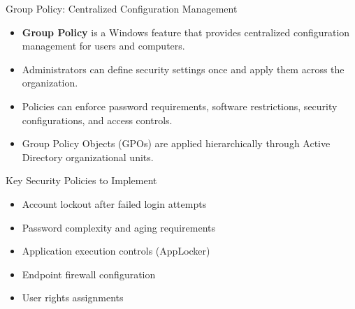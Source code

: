 \documentclass{beamer}
\begin{document}
            \begin{frame}{Group Policy: Centralized Configuration Management}
            \begin{itemize}
                \item \textbf{Group Policy} is a Windows feature that provides centralized configuration management for users and computers.
                \item Administrators can define security settings once and apply them across the organization.
                \item Policies can enforce password requirements, software restrictions, security configurations, and access controls.
                \item Group Policy Objects (GPOs) are applied hierarchically through Active Directory organizational units.
            \end{itemize}
            
            \begin{block}{Key Security Policies to Implement}
            \begin{itemize}
                \item Account lockout after failed login attempts
                \item Password complexity and aging requirements
                \item Application execution controls (AppLocker)
                \item Endpoint firewall configuration
                \item User rights assignments
            \end{itemize}
            \end{block}
            \end{frame}
\end{document}
